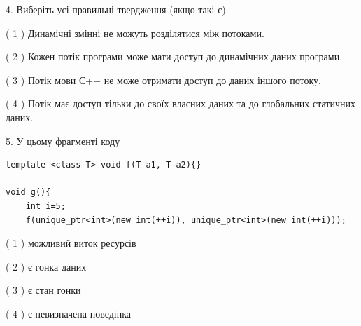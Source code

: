 \documentclass[12pt, ukrainian]{article}
\begin{document}
\begin {large}
{%
4. Виберіть усі правильні твердження (якщо такі є).\par
\vspace{2mm}

( 1 ) Динамічні змінні не можуть розділятися між потоками.%

( 2 ) Кожен потік програми може мати доступ до динамічних даних програми.%

( 3 ) Потік мови С++ не може отримати доступ до даних іншого потоку.%

( 4 ) Потік має доступ тільки до своїх власних даних та до глобальних статичних даних.%


5. У цьому фрагменті коду
\begin{verbatim}
template <class T> void f(T a1, T a2){}

void g(){
    int i=5;
    f(unique_ptr<int>(new int(++i)), unique_ptr<int>(new int(++i)));
\end{verbatim}

( 1 ) можливий виток ресурсів%

( 2 ) є гонка даних%

( 3 ) є стан гонки%

( 4 ) є невизначена поведінка%
}
\end {large}
\end{document}

